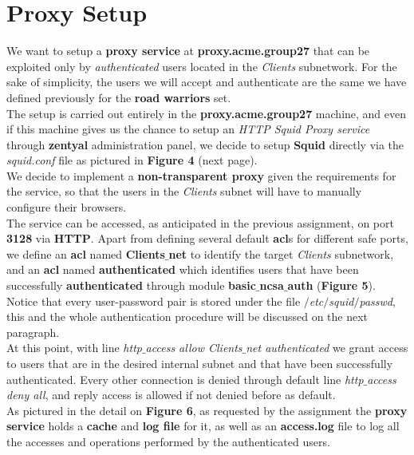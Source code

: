 \section{Proxy Setup}
We want to setup a \textbf{proxy service} at \textbf{proxy.acme.group27} that can be exploited only by \textit{authenticated} users located in the \textit{Clients} subnetwork. For the sake of simplicity, the users we will accept and authenticate are the same we have defined previously for the \textbf{road warriors} set.\\
The setup is carried out entirely in the \textbf{proxy.acme.group27} machine, and even if this machine gives us the chance to setup an \textit{HTTP Squid Proxy service} through \textbf{zentyal} administration panel, we decide to setup \textbf{Squid} directly via the \textit{squid.conf} file as pictured in \textbf{Figure 4} (next page).\\
We decide to implement a \textbf{non-transparent proxy} given the requirements for the service, so that the users in the \textit{Clients} subnet will have to manually configure their browsers.\\
The service can be accessed, as anticipated in the previous assignment, on port \textbf{3128} via \textbf{HTTP}. Apart from defining several default \textbf{acl}s for different safe ports, we define an \textbf{acl} named \textbf{Clients$\_$net} to identify the target \textit{Clients} subnetwork, and an \textbf{acl} named \textbf{authenticated} which identifies users that have been successfully \textbf{authenticated} through module \textbf{basic$\_$ncsa$\_$auth} (\textbf{Figure 5}).\\
Notice that every user-password pair is stored under the file \textit{$/$etc$/$squid$/$passwd}, this and the whole authentication procedure will be discussed on the next paragraph.\\
At this point, with line \textit{http$\_$access allow Clients$\_$net authenticated} we grant access to users that are in the desired internal subnet and that have been successfully authenticated. Every other connection is denied through default line \textit{http$\_$access deny all}, and reply access is allowed if not denied before as default.\\
As pictured in the detail on \textbf{Figure 6}, as requested by the assignment the \textbf{proxy service} holds a \textbf{cache} and \textbf{log file} for it, as well as an \textbf{access.log} file to log all the accesses and operations performed by the authenticated users.\\
